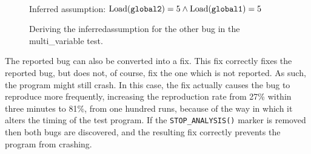 \begin{figure}
  \centerline{
    {\hfill}
  {\hfill}
  \\
  {\hfill}
  }
  \vspace{12pt}
  \centerline{Inferred assumption: $\mathrm{Load}(\texttt{global2}) = 5 \wedge \mathrm{Load}(\texttt{global1}) = 5$}
  \caption{Deriving the \gls{inferredassumption} for the other bug in
    the multi\_variable test.}
  \label{fig:eval:multi_variable:other_bug}
\end{figure}

The reported bug can also be converted into a fix.  This fix correctly
fixes the reported bug, but does not, of course, fix the one which is
not reported.  As such, the program might still crash.  In this case,
the fix actually causes the bug to reproduce more frequently,
increasing the reproduction rate from 27\% within three minutes to
81\%, from one hundred runs, because of the way in which it alters the
timing of the test program.  If the \texttt{STOP\_ANALYSIS()} marker
is removed then both bugs are discovered, and the resulting fix
correctly prevents the program from crashing.

